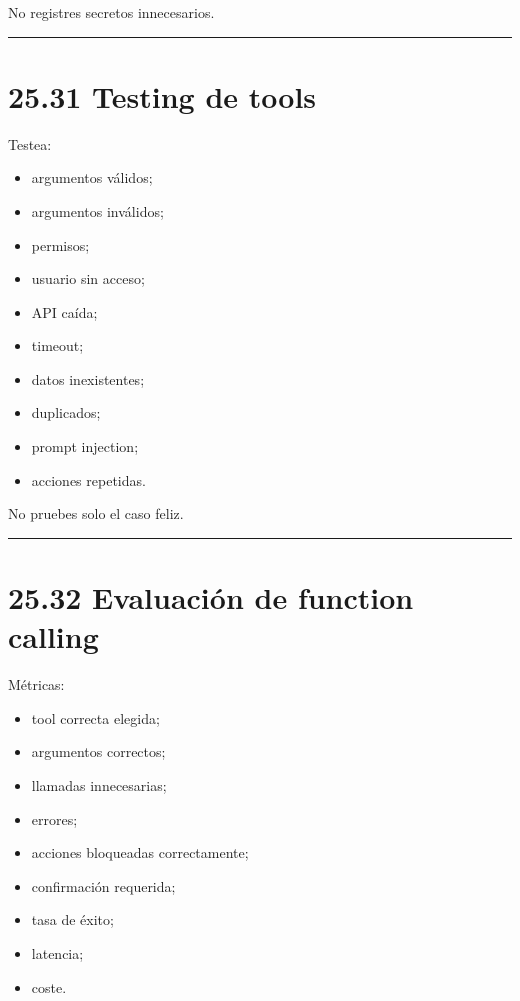 No registres secretos innecesarios.

\begin{center}\rule{0.5\linewidth}{0.5pt}\end{center}

\section{25.31 Testing de tools}\label{testing-de-tools}

Testea:

\begin{itemize}
\tightlist
\item
  argumentos válidos;
\item
  argumentos inválidos;
\item
  permisos;
\item
  usuario sin acceso;
\item
  API caída;
\item
  timeout;
\item
  datos inexistentes;
\item
  duplicados;
\item
  prompt injection;
\item
  acciones repetidas.
\end{itemize}

No pruebes solo el caso feliz.

\begin{center}\rule{0.5\linewidth}{0.5pt}\end{center}

\section{25.32 Evaluación de function
calling}\label{evaluaciuxf3n-de-function-calling}

Métricas:

\begin{itemize}
\tightlist
\item
  tool correcta elegida;
\item
  argumentos correctos;
\item
  llamadas innecesarias;
\item
  errores;
\item
  acciones bloqueadas correctamente;
\item
  confirmación requerida;
\item
  tasa de éxito;
\item
  latencia;
\item
  coste.
\end{itemize}

